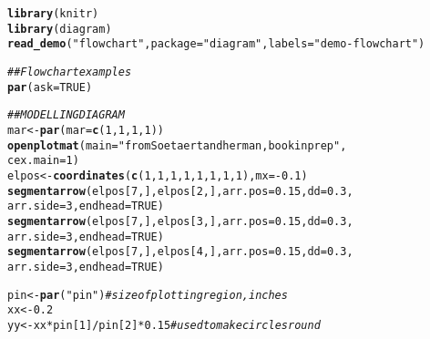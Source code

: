 \documentclass{article}\usepackage[]{graphicx}\usepackage[]{color}
\makeatletter
\newcommand{\hlnum}[1]{\textcolor[rgb]{0.686,0.059,0.569}{#1}}%
\newcommand{\hlstr}[1]{\textcolor[rgb]{0.192,0.494,0.8}{#1}}%
\newcommand{\hlcom}[1]{\textcolor[rgb]{0.678,0.584,0.686}{\textit{#1}}}%
\newcommand{\hlopt}[1]{\textcolor[rgb]{0,0,0}{#1}}%
\newcommand{\hlstd}[1]{\textcolor[rgb]{0.345,0.345,0.345}{#1}}%
\newcommand{\hlkwb}[1]{\textcolor[rgb]{0.69,0.353,0.396}{#1}}%
\newcommand{\hlkwc}[1]{\textcolor[rgb]{0.333,0.667,0.333}{#1}}%
\newcommand{\hlkwd}[1]{\textcolor[rgb]{0.737,0.353,0.396}{\textbf{#1}}}%
\newenvironment{kframe}{%
 \def\at@end@of@kframe{}%
 \ifinner\ifhmode%
  \def\at@end@of@kframe{\end{minipage}}%
  \begin{minipage}{\columnwidth}%
 \fi\fi%
 \def\FrameCommand##1{\hskip\@totalleftmargin \hskip-\fboxsep
 \colorbox{shadecolor}{##1}\hskip-\fboxsep
     \hskip-\linewidth \hskip-\@totalleftmargin \hskip\columnwidth}%
 \MakeFramed {\advance\hsize-\width
   \@totalleftmargin\z@ \linewidth\hsize
   \@setminipage}}%
 {\par\unskip\endMakeFramed%
 \at@end@of@kframe}
\newenvironment{knitrout}{}{} %
\makeatother
\begin{document}
\begin{knitrout}
\color{fgcolor}\begin{kframe}
\begin{alltt}
\hlkwd{library}\hlstd{(knitr)}
\hlkwd{library}\hlstd{(diagram)}
\hlkwd{read_demo}\hlstd{(}\hlstr{"flowchart"}\hlstd{,} \hlkwc{package} \hlstd{=} \hlstr{"diagram"}\hlstd{,} \hlkwc{labels} \hlstd{=} \hlstr{"demo-flowchart"}\hlstd{)}
\end{alltt}
\end{kframe}
\end{knitrout}
\begin{knitrout}
\color{fgcolor}\begin{kframe}
\begin{alltt}
\hlcom{## Flowchart examples}
\hlkwd{par}\hlstd{(}\hlkwc{ask} \hlstd{=} \hlnum{TRUE}\hlstd{)}

\hlcom{## MODELLING DIAGRAM}
\hlstd{mar} \hlkwb{<-} \hlkwd{par}\hlstd{(}\hlkwc{mar} \hlstd{=} \hlkwd{c}\hlstd{(}\hlnum{1}\hlstd{,} \hlnum{1}\hlstd{,} \hlnum{1}\hlstd{,} \hlnum{1}\hlstd{))}
\hlkwd{openplotmat}\hlstd{(}\hlkwc{main} \hlstd{=} \hlstr{"from Soetaert and herman, book in prep"}\hlstd{,}
    \hlkwc{cex.main} \hlstd{=} \hlnum{1}\hlstd{)}
\hlstd{elpos} \hlkwb{<-} \hlkwd{coordinates}\hlstd{(}\hlkwd{c}\hlstd{(}\hlnum{1}\hlstd{,} \hlnum{1}\hlstd{,} \hlnum{1}\hlstd{,} \hlnum{1}\hlstd{,} \hlnum{1}\hlstd{,} \hlnum{1}\hlstd{,} \hlnum{1}\hlstd{,} \hlnum{1}\hlstd{),} \hlkwc{mx} \hlstd{=} \hlopt{-}\hlnum{0.1}\hlstd{)}
\hlkwd{segmentarrow}\hlstd{(elpos[}\hlnum{7}\hlstd{, ], elpos[}\hlnum{2}\hlstd{, ],} \hlkwc{arr.pos} \hlstd{=} \hlnum{0.15}\hlstd{,} \hlkwc{dd} \hlstd{=} \hlnum{0.3}\hlstd{,}
    \hlkwc{arr.side} \hlstd{=} \hlnum{3}\hlstd{,} \hlkwc{endhead} \hlstd{=} \hlnum{TRUE}\hlstd{)}
\hlkwd{segmentarrow}\hlstd{(elpos[}\hlnum{7}\hlstd{, ], elpos[}\hlnum{3}\hlstd{, ],} \hlkwc{arr.pos} \hlstd{=} \hlnum{0.15}\hlstd{,} \hlkwc{dd} \hlstd{=} \hlnum{0.3}\hlstd{,}
    \hlkwc{arr.side} \hlstd{=} \hlnum{3}\hlstd{,} \hlkwc{endhead} \hlstd{=} \hlnum{TRUE}\hlstd{)}
\hlkwd{segmentarrow}\hlstd{(elpos[}\hlnum{7}\hlstd{, ], elpos[}\hlnum{4}\hlstd{, ],} \hlkwc{arr.pos} \hlstd{=} \hlnum{0.15}\hlstd{,} \hlkwc{dd} \hlstd{=} \hlnum{0.3}\hlstd{,}
    \hlkwc{arr.side} \hlstd{=} \hlnum{3}\hlstd{,} \hlkwc{endhead} \hlstd{=} \hlnum{TRUE}\hlstd{)}

\hlstd{pin} \hlkwb{<-} \hlkwd{par}\hlstd{(}\hlstr{"pin"}\hlstd{)}  \hlcom{# size of plotting region, inches}
\hlstd{xx} \hlkwb{<-} \hlnum{0.2}
\hlstd{yy} \hlkwb{<-} \hlstd{xx} \hlopt{*} \hlstd{pin[}\hlnum{1}\hlstd{]}\hlopt{/}\hlstd{pin[}\hlnum{2}\hlstd{]} \hlopt{*} \hlnum{0.15}  \hlcom{# used to make circles round}


\end{alltt}
\end{kframe}
\end{knitrout}
\end{document}
